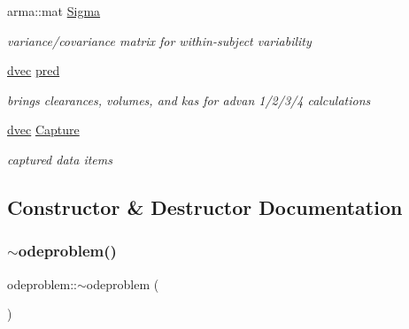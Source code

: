 \begin{DoxyCompactItemize}
\mbox{\label{classodeproblem_ada2a77ef3f99c53d24e64026f356b99d}} 
arma\+::mat \hyperlink{classodeproblem_ada2a77ef3f99c53d24e64026f356b99d}{Sigma}
\begin{DoxyCompactList}\small\item\em variance/covariance matrix for within-\/subject variability \end{DoxyCompactList}\item 
\mbox{\label{classodeproblem_a2f93a3e1c10c2d1bba1a359bb3321cc0}} 
\hyperlink{mrgsolv_8h_ac6aa1a2351760492203846ae74778c05}{dvec} \hyperlink{classodeproblem_a2f93a3e1c10c2d1bba1a359bb3321cc0}{pred}
\begin{DoxyCompactList}\small\item\em brings clearances, volumes, and kas for advan 1/2/3/4 calculations \end{DoxyCompactList}\item 
\mbox{\label{classodeproblem_a4244e3ca9e9d52598d776c45fbb18ca4}} 
\hyperlink{mrgsolv_8h_ac6aa1a2351760492203846ae74778c05}{dvec} \hyperlink{classodeproblem_a4244e3ca9e9d52598d776c45fbb18ca4}{Capture}
\begin{DoxyCompactList}\small\item\em captured data items \end{DoxyCompactList}\end{DoxyCompactItemize}


\subsection{Constructor \& Destructor Documentation}
\mbox{\label{classodeproblem_a00c35020fc03286fd4596f25b3d82e34}} 
\subsubsection{\texorpdfstring{$\sim$odeproblem()}{~odeproblem()}}
{\footnotesize\ttfamily odeproblem\+::$\sim$odeproblem (\begin{DoxyParamCaption}{ }\end{DoxyParamCaption})\hspace{0.3cm}{\ttfamily [virtual]}}



